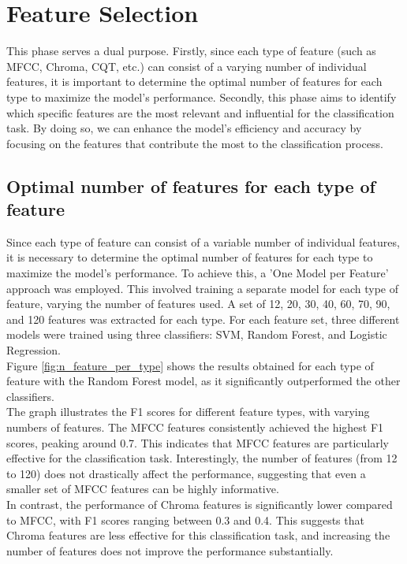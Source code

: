 \section{Feature Selection}
This phase serves a dual purpose. Firstly, since each type of feature (such as MFCC, Chroma, CQT, etc.) can consist of a varying number of individual features,
it is important to determine the optimal number of features for each type to maximize the model's performance.
Secondly, this phase aims to identify which specific features are the most relevant and influential for the classification task.
By doing so, we can enhance the model's efficiency and accuracy by focusing on the features that contribute the most to the classification process.

\subsection{Optimal number of features for each type of feature}
Since each type of feature can consist of a variable number of individual features,
it is necessary to determine the optimal number of features for each type to maximize the model's performance.
To achieve this, a 'One Model per Feature' approach was employed. This involved training a separate model for each type of feature,
varying the number of features used. A set of 12, 20, 30, 40, 60, 70, 90, and 120 features was extracted for each type. For each feature set,
three different models were trained using three classifiers: SVM, Random Forest, and Logistic Regression.\\
Figure \ref{fig:n_feature_per_type} shows the results obtained for each type of feature with the Random Forest model,
as it significantly outperformed the other classifiers.\\
The graph illustrates the F1 scores for different feature types, with varying numbers of features.
The MFCC features consistently achieved the highest F1 scores, peaking around 0.7.
This indicates that MFCC features are particularly effective for the classification task.
Interestingly, the number of features (from 12 to 120) does not drastically affect the performance, suggesting that even a smaller set of MFCC
features can be highly informative.\\
In contrast, the performance of Chroma features is significantly lower compared to MFCC, with F1 scores ranging between 0.3 and 0.4.
This suggests that Chroma features are less effective for this classification task,
and increasing the number of features does not improve the performance substantially.\\
